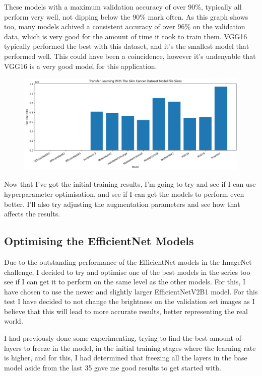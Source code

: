 \documentclass[]{final_report}
\begin{document}
These models with a maximum validation accuracy of over 90\%, typically all perform very well, not dipping below the 90\% mark often. As this graph shows too, many models achived a consistent accuracy of over 96\% on the validation data, which is very good for the amount of time it took to train them. VGG16 typically performed the best with this dataset, and it's the smallest model that performed well. This could have been a coincidence, however it's undenyable that VGG16 is a very good model for this application.

\begin{figure}[ht!]
  \centering
  \includegraphics[width=1\textwidth]{images/skin-cancer-model-sizes-graph.png}
\end{figure}

Now that I've got the initial training results, I'm going to try and see if I can use hyperparameter optimisation, and see if I can get the models to perform even better. I'll also try adjusting the augmentation parameters and see how that affects the results.

\subsection{Optimising the EfficientNet Models}

Due to the outstanding performance of the EfficientNet models in the ImageNet challenge, I decided to try and optimise one of the best models in the series too see if I can get it to perform on the same level as the other models. For this, I have chosen to use the newer and slightly larger EfficientNetV2B1 model. For this test I have decided to not change the brightness on the validation set images as I believe that this will lead to more accurate results, better representing the real world.

I had previously done some experimenting, trying to find the best amount of layers to freeze in the model, in the initial training stages where the learning rate is higher, and for this, I had determined that freezing all the layers in the base model aside from the last 35 gave me good results to get started with.
\end{document}

